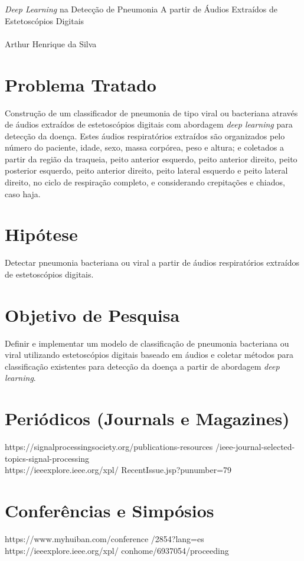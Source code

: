 \documentclass[12pt]{article}
\begin{document}
\begin{center}
{\large \textit{Deep Learning} na Detecção de Pneumonia A partir de Áudios Extraídos de Estetoscópios Digitais} \\  %
\ \\
Arthur Henrique da Silva \\
\end{center}

\begin{multicols}{2}

\section{Problema Tratado}
Construção de um classificador de pneumonia de tipo viral ou bacteriana através de áudios extraídos de estetoscópios digitais com abordagem 
\textit{deep learning} para detecção da doença. Estes áudios respiratórios extraídos são organizados pelo número do paciente, idade, sexo, massa corpórea, peso e altura; e coletados a partir da região da traqueia, peito anterior esquerdo, peito anterior direito, peito posterior esquerdo, peito anterior direito, peito lateral esquerdo e peito lateral direito, no ciclo de respiração completo, e considerando crepitações e chiados, caso haja.

\section{Hipótese}
Detectar pneumonia bacteriana ou viral a partir de áudios respiratórios extraídos de estetoscópios digitais.
\ \\
\section{Objetivo de Pesquisa}

Definir e implementar um modelo de classificação de pneumonia bacteriana ou viral utilizando estetoscópios digitais baseado em áudios e coletar métodos para classificação existentes para detecção da doença a partir de abordagem \textit{deep learning}.

\section{Periódicos (Journals e Magazines)}

https://signalprocessingsociety.org/publications-resources
/ieee-journal-selected-topics-signal-processing
\ \\
https://ieeexplore.ieee.org/xpl/
RecentIssue.jsp?punumber=79



\section{Conferências e Simpósios}

https://www.myhuiban.com/conference
/2854?lang=es
\ \\
https://ieeexplore.ieee.org/xpl/
conhome/6937054/proceeding


\end{multicols}
\end{document}
